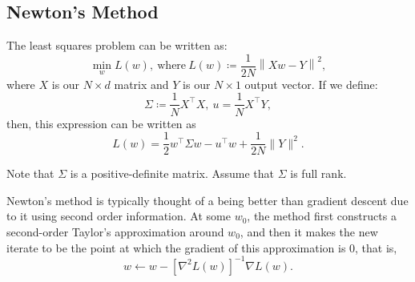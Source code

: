 \documentclass[letterpaper,11pt]{article}
\begin{document}
\subsection*{Newton's Method}

The least squares problem can be written as:
\begin{equation}
  \min_{w}L(w),~\text{where}~L(w) \coloneqq \frac{1}{2N}\left\lVert Xw - Y\right\rVert^2,
\end{equation}
where $X$ is our $N \times d$ matrix and $Y$ is our $N \times 1$ output vector. If we define:
\begin{equation}
  \Sigma \coloneqq \frac{1}{N}X^\intercal X,~u = \frac{1}{N}X^\intercal Y,
\end{equation}
then, this expression can be written as
\begin{equation}
  L(w) = \frac{1}{2}w^\intercal\Sigma w - u^\intercal w + \frac{1}{2N}\lVert Y \rVert^2.
\end{equation}

Note that $\Sigma$ is a positive-definite matrix. Assume that $\Sigma$ is full
rank.

Newton's method is typically thought of a being better than gradient descent due
to it using second order information. At some $w_0$, the method first constructs
a second-order Taylor's approximation around $w_0$, and then it makes the new
iterate to be the point at which the gradient of this approximation is $0$, that
is,
\begin{equation}
  w \leftarrow w - \left[ \nabla^2 L(w) \right]^{-1} \nabla L(w).
  \label{eqn:newton_update}
\end{equation}
\end{document}
